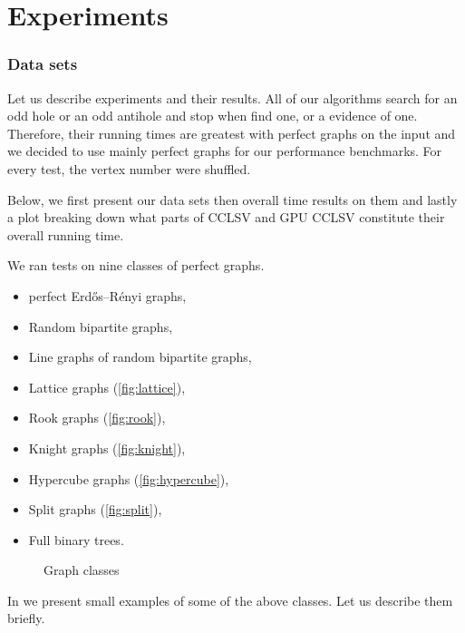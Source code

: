 \section{Experiments}
\label{sec:experiments}

\subsubsection{Data sets}

Let us describe experiments and their results. All of our algorithms search for an odd hole or an odd antihole and stop when find one, or a evidence of one. Therefore, their running times are greatest with perfect graphs on the input and we decided to use mainly perfect graphs for our performance benchmarks. For every test, the vertex number were shuffled.

Below, we first present our data sets then overall time results on them and lastly a plot breaking down what parts of CCLSV and GPU CCLSV constitute their overall running time.

We ran tests on nine classes of perfect graphs.
\begin{itemize}
  \item perfect Erd\H{o}s--Rényi graphs,
  \item Random bipartite graphs,
  \item Line graphs of random bipartite graphs,
  \item Lattice graphs (\cref{fig:lattice}),
  \item Rook graphs (\cref{fig:rook}),
  \item Knight graphs (\cref{fig:knight}),
  \item Hypercube graphs (\cref{fig:hypercube}),
  \item Split graphs (\cref{fig:split}),
  \item Full binary trees.
\end{itemize}

\begin{figure}
  
  \caption{Graph classes}
  \label{fig:graphClasses}
\end{figure}

In  we present small examples of some of the above classes. Let us describe them briefly.


